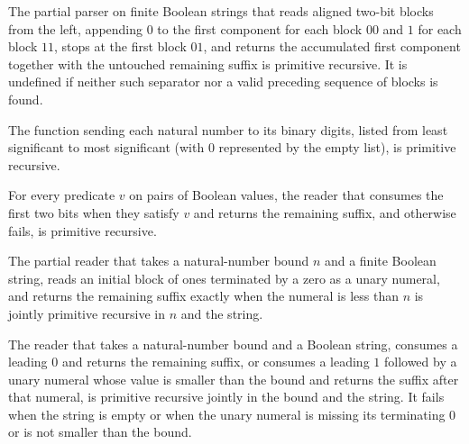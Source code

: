 \begin{lemma}
\label{Turing.codePrimPair}
\leanok
{}
The partial parser on finite Boolean strings that reads aligned two-bit blocks from the
left, appending $0$ to the first component for each block $00$ and $1$ for each block
$11$, stops at the first block $01$, and returns the accumulated first component
together with the untouched remaining suffix is primitive recursive. It is undefined if
neither such separator nor a valid preceding sequence of blocks is found.
\end{lemma}

\begin{lemma}
\label{Turing.codePrimBits}
\leanok
{}
The function sending each natural number to its binary digits, listed from least
significant to most significant (with $0$ represented by the empty list), is primitive
recursive.
\end{lemma}

\begin{lemma}
\label{Turing.codePrimSkipPair}
\leanok
{}
For every predicate $v$ on pairs of Boolean values, the reader that consumes the first
two bits when they satisfy $v$ and returns the remaining suffix, and otherwise fails, is
primitive recursive.
\end{lemma}

\begin{lemma}
\label{Turing.codePrimSkipFin}
\leanok
{}
The partial reader that takes a natural-number bound $n$ and a finite Boolean string,
reads an initial block of ones terminated by a zero as a unary numeral, and returns the
remaining suffix exactly when the numeral is less than $n$ is jointly primitive
recursive in $n$ and the string.
\end{lemma}

\begin{lemma}
\label{Turing.codePrimSkipState}
\leanok
{}
The reader that takes a natural-number bound and a Boolean string, consumes a leading
$0$ and returns the remaining suffix, or consumes a leading $1$ followed by a unary
numeral whose value is smaller than the bound and returns the suffix after that numeral,
is primitive recursive jointly in the bound and the string. It fails when the string is
empty or when the unary numeral is missing its terminating $0$ or is not smaller than
the bound.
\end{lemma}

